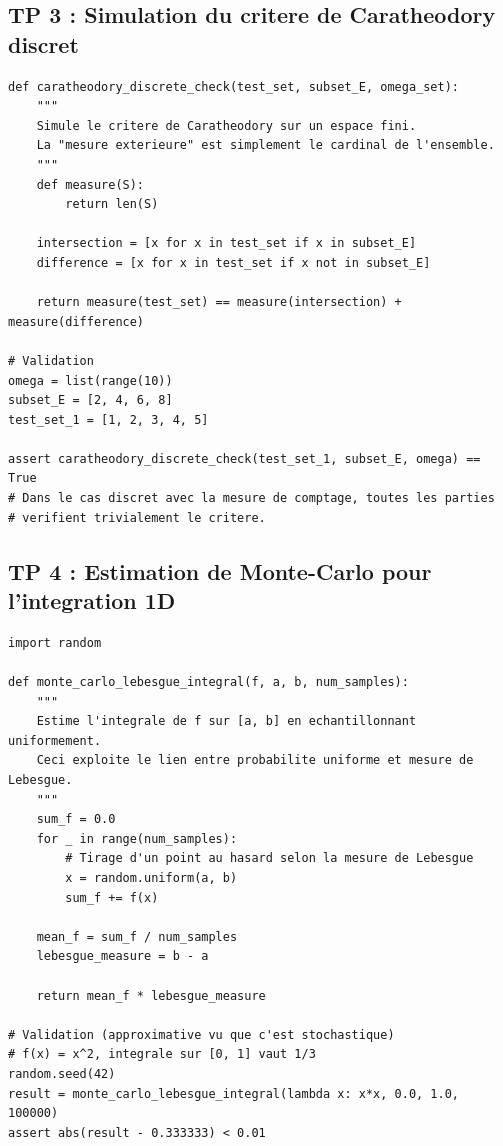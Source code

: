 \documentclass[11pt,a4paper]{article}
\begin{document}
\newpage
\subsection*{TP 3 : Simulation du critere de Caratheodory discret}

\begin{lstlisting}
def caratheodory_discrete_check(test_set, subset_E, omega_set):
    """
    Simule le critere de Caratheodory sur un espace fini.
    La "mesure exterieure" est simplement le cardinal de l'ensemble.
    """
    def measure(S):
        return len(S)

    intersection = [x for x in test_set if x in subset_E]
    difference = [x for x in test_set if x not in subset_E]

    return measure(test_set) == measure(intersection) + measure(difference)

# Validation
omega = list(range(10))
subset_E = [2, 4, 6, 8]
test_set_1 = [1, 2, 3, 4, 5]

assert caratheodory_discrete_check(test_set_1, subset_E, omega) == True
# Dans le cas discret avec la mesure de comptage, toutes les parties
# verifient trivialement le critere.
\end{lstlisting}

\newpage
\subsection*{TP 4 : Estimation de Monte-Carlo pour l'integration 1D}

\begin{lstlisting}
import random

def monte_carlo_lebesgue_integral(f, a, b, num_samples):
    """
    Estime l'integrale de f sur [a, b] en echantillonnant uniformement.
    Ceci exploite le lien entre probabilite uniforme et mesure de Lebesgue.
    """
    sum_f = 0.0
    for _ in range(num_samples):
        # Tirage d'un point au hasard selon la mesure de Lebesgue
        x = random.uniform(a, b)
        sum_f += f(x)

    mean_f = sum_f / num_samples
    lebesgue_measure = b - a

    return mean_f * lebesgue_measure

# Validation (approximative vu que c'est stochastique)
# f(x) = x^2, integrale sur [0, 1] vaut 1/3
random.seed(42)
result = monte_carlo_lebesgue_integral(lambda x: x*x, 0.0, 1.0, 100000)
assert abs(result - 0.333333) < 0.01
\end{lstlisting}
\end{document}
